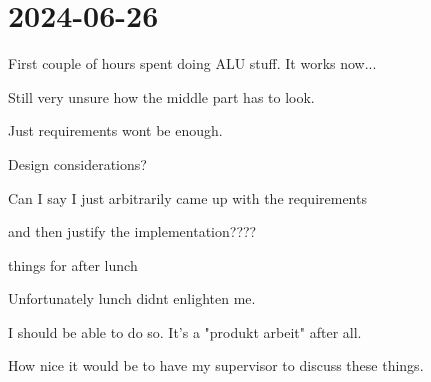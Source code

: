 \section{2024-06-26}

First couple of hours spent doing ALU stuff. It works now... 

Still very unsure how the middle part has to look. 

Just requirements wont be enough. 

Design considerations?

Can I say I just arbitrarily came up with the requirements

and then justify the implementation????

things for after lunch

Unfortunately lunch didnt enlighten me.

I should be able to do so. It's a "produkt arbeit" after all. 

How nice it would be to have my supervisor to discuss these things. 

